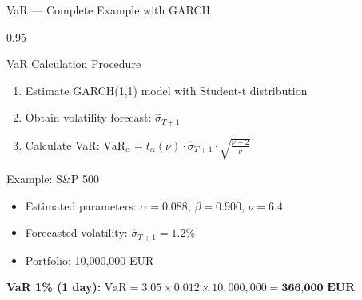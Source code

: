 \documentclass[9pt, aspectratio=169, t]{beamer}
\begin{document}
\begin{frame}{VaR --- Complete Example with GARCH}
    \begin{cminipage}{0.95\textwidth}
    \begin{block}{VaR Calculation Procedure}
        \begin{enumerate}\setlength{\itemsep}{0pt}
            \item Estimate GARCH(1,1) model with Student-t distribution
            \item Obtain volatility forecast: $\hat{\sigma}_{T+1}$
            \item Calculate VaR: $\text{VaR}_\alpha = t_\alpha(\nu) \cdot \hat{\sigma}_{T+1} \cdot \sqrt{\frac{\nu-2}{\nu}}$
        \end{enumerate}
    \end{block}

    \vspace{0.2cm}

    \begin{exampleblock}{Example: S\&P 500}
        \begin{itemize}\setlength{\itemsep}{0pt}
            \item Estimated parameters: $\alpha = 0.088$, $\beta = 0.900$, $\nu = 6.4$
            \item Forecasted volatility: $\hat{\sigma}_{T+1} = 1.2\%$
            \item Portfolio: 10,000,000 EUR
        \end{itemize}

        \vspace{0.2cm}

        \textbf{VaR 1\% (1 day):}
        $\text{VaR} = 3.05 \times 0.012 \times 10{,}000{,}000 = \textbf{366{,}000 EUR}$
    \end{exampleblock}
    \end{cminipage}
\end{frame}
\end{document}
